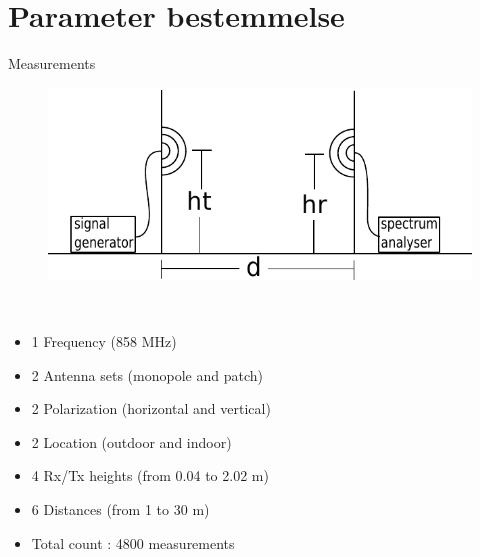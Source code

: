 \section{Parameter bestemmelse}
\begin{frame}{Measurements}
\begin{figure}[!htbp]
	\centering
	\includegraphics[width = 0.8\columnwidth]{figures/setup.pdf}
\end{figure}
\begin{minipage}{0.15\textwidth}
 \textcolor{white}{.}  
\end{minipage}%
\begin{minipage}{0.8\textwidth}
\begin{itemize}
\item 1 Frequency (858 MHz)
\item 2 Antenna sets (monopole and patch)
\item 2 Polarization (horizontal and vertical)
\item 2 Location (outdoor and indoor)
\item 4 Rx/Tx heights (from 0.04 to 2.02 m)
\item 6 Distances (from 1 to 30 m)
\item Total count : 4800 measurements
\end{itemize}
\end{minipage}
\end{frame}